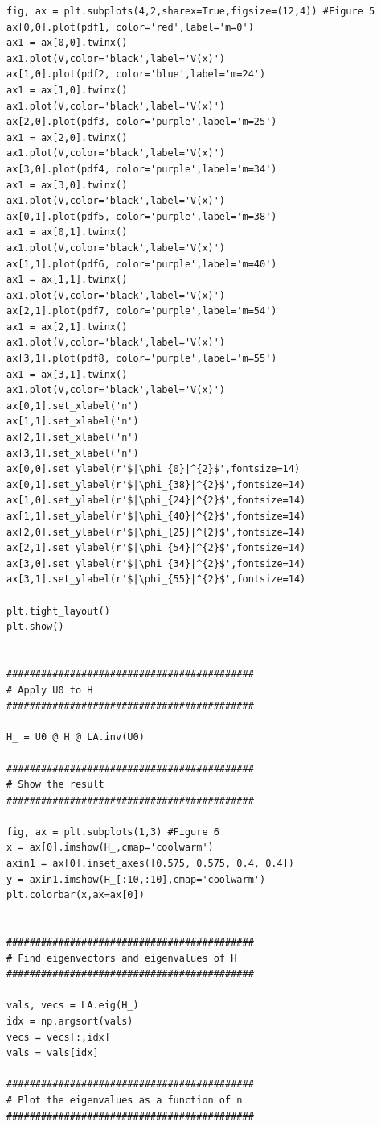 \documentclass[12pt]{article}
\theoremstyle{definition}
\begin{document}
{\begin{lstlisting}
fig, ax = plt.subplots(4,2,sharex=True,figsize=(12,4)) #Figure 5
ax[0,0].plot(pdf1, color='red',label='m=0')
ax1 = ax[0,0].twinx()
ax1.plot(V,color='black',label='V(x)')
ax[1,0].plot(pdf2, color='blue',label='m=24')
ax1 = ax[1,0].twinx()
ax1.plot(V,color='black',label='V(x)')
ax[2,0].plot(pdf3, color='purple',label='m=25')
ax1 = ax[2,0].twinx()
ax1.plot(V,color='black',label='V(x)')
ax[3,0].plot(pdf4, color='purple',label='m=34')
ax1 = ax[3,0].twinx()
ax1.plot(V,color='black',label='V(x)')
ax[0,1].plot(pdf5, color='purple',label='m=38')
ax1 = ax[0,1].twinx()
ax1.plot(V,color='black',label='V(x)')
ax[1,1].plot(pdf6, color='purple',label='m=40')
ax1 = ax[1,1].twinx()
ax1.plot(V,color='black',label='V(x)')
ax[2,1].plot(pdf7, color='purple',label='m=54')
ax1 = ax[2,1].twinx()
ax1.plot(V,color='black',label='V(x)')
ax[3,1].plot(pdf8, color='purple',label='m=55')
ax1 = ax[3,1].twinx()
ax1.plot(V,color='black',label='V(x)')
ax[0,1].set_xlabel('n')
ax[1,1].set_xlabel('n')
ax[2,1].set_xlabel('n')
ax[3,1].set_xlabel('n')
ax[0,0].set_ylabel(r'$|\phi_{0}|^{2}$',fontsize=14)
ax[0,1].set_ylabel(r'$|\phi_{38}|^{2}$',fontsize=14)
ax[1,0].set_ylabel(r'$|\phi_{24}|^{2}$',fontsize=14)
ax[1,1].set_ylabel(r'$|\phi_{40}|^{2}$',fontsize=14)
ax[2,0].set_ylabel(r'$|\phi_{25}|^{2}$',fontsize=14)
ax[2,1].set_ylabel(r'$|\phi_{54}|^{2}$',fontsize=14)
ax[3,0].set_ylabel(r'$|\phi_{34}|^{2}$',fontsize=14)
ax[3,1].set_ylabel(r'$|\phi_{55}|^{2}$',fontsize=14)

plt.tight_layout()
plt.show()


###########################################
# Apply U0 to H
###########################################

H_ = U0 @ H @ LA.inv(U0)

###########################################
# Show the result
###########################################

fig, ax = plt.subplots(1,3) #Figure 6
x = ax[0].imshow(H_,cmap='coolwarm')
axin1 = ax[0].inset_axes([0.575, 0.575, 0.4, 0.4])
y = axin1.imshow(H_[:10,:10],cmap='coolwarm')
plt.colorbar(x,ax=ax[0])


###########################################
# Find eigenvectors and eigenvalues of H
###########################################

vals, vecs = LA.eig(H_)
idx = np.argsort(vals)
vecs = vecs[:,idx]
vals = vals[idx]

###########################################
# Plot the eigenvalues as a function of n
###########################################


\end{lstlisting}}
\end{document}
